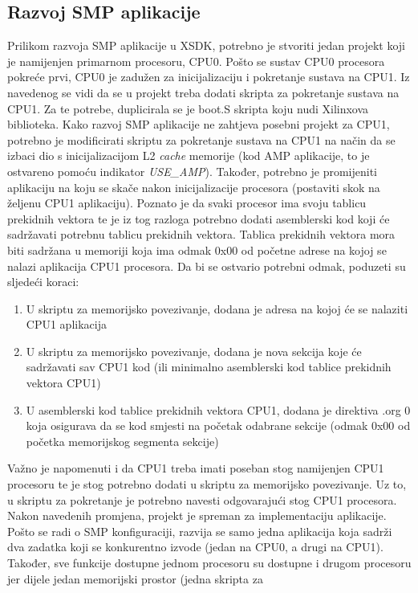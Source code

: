 \documentclass[times, utf8, diplomski, numeric]{fer}
\begin{document}
\subsection{Razvoj SMP aplikacije}
Prilikom razvoja SMP aplikacije u XSDK, potrebno je stvoriti jedan projekt koji je namijenjen primarnom procesoru, CPU0.
Pošto se sustav CPU0 procesora pokreće prvi, CPU0 je zadužen za inicijalizaciju i pokretanje sustava na CPU1. Iz navedenog
se vidi da se u projekt treba dodati skripta za pokretanje sustava na CPU1. Za te potrebe, duplicirala se je boot.S skripta
koju nudi Xilinxova biblioteka. Kako razvoj SMP aplikacije ne zahtjeva posebni projekt za CPU1, potrebno je modificirati
skriptu za pokretanje sustava na CPU1 na način da se izbaci dio s inicijalizacijom L2 \textit{cache} memorije (kod AMP
aplikacije, to je ostvareno pomoću indikator \textit{USE\_AMP}). Također, potrebno je promijeniti aplikaciju na koju se skače nakon
inicijalizacije procesora (postaviti skok na željenu CPU1 aplikaciju). Poznato je da svaki procesor ima svoju tablicu
prekidnih vektora te je iz tog razloga potrebno dodati asemblerski kod koji će sadržavati potrebnu tablicu prekidnih vektora.
Tablica prekidnih vektora mora biti sadržana u memoriji koja ima odmak 0x00 od početne adrese na kojoj se nalazi
aplikacija CPU1 procesora. Da bi se ostvario potrebni odmak, poduzeti su sljedeći koraci:
\begin{enumerate}
  \item{U skriptu za memorijsko povezivanje, dodana je adresa na kojoj će se nalaziti CPU1 aplikacija}
  \item{U skriptu za memorijsko povezivanje, dodana je nova sekcija koje će sadržavati sav CPU1 kod (ili minimalno asemblerski
  kod tablice prekidnih vektora CPU1)}
  \item{U asemblerski kod tablice prekidnih vektora CPU1, dodana je direktiva .org 0 koja osigurava da se kod smjesti na
  početak odabrane sekcije (odmak 0x00 od početka memorijskog segmenta sekcije)}
\end{enumerate}
Važno je napomenuti i da CPU1 treba imati poseban stog namijenjen CPU1 procesoru te je stog potrebno dodati u skriptu za
memorijsko povezivanje. Uz to, u skriptu za pokretanje je potrebno navesti odgovarajući stog CPU1 procesora.
Nakon navedenih promjena, projekt je spreman za implementaciju aplikacije. Pošto se radi o SMP konfiguraciji, razvija se
samo jedna aplikacija koja sadrži dva zadatka koji se konkurentno izvode (jedan na CPU0, a drugi na CPU1). Također, sve
funkcije dostupne jednom procesoru su dostupne i drugom procesoru jer dijele jedan memorijski prostor (jedna skripta za
\end{document}
